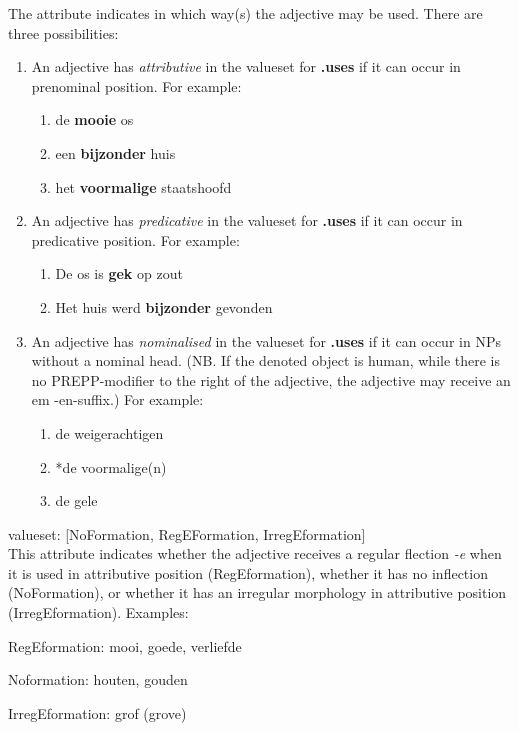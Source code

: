 \begin{description}
The attribute indicates in which way(s) the adjective may be used.
There are three possibilities:\\
\begin{enumerate}
  \item An adjective has {\em attributive} in the valueset for {\bf .uses}
 if it can occur in prenominal position. For example:
\begin{enumerate}
  \item de {\bf mooie} os
  \item een {\bf bijzonder} huis
  \item het  {\bf voormalige} staatshoofd
\end{enumerate}
  \item An adjective has {\em predicative} in the valueset for {\bf .uses}
 if it can occur in predicative position. For example:
\begin{enumerate}
  \item De os is {\bf gek} op zout 
  \item Het huis werd {\bf bijzonder} gevonden
\end{enumerate}
  \item An adjective has {\em nominalised} in the valueset for {\bf .uses}
 if it can occur in NPs without a nominal head. (NB. If the denoted object
is human, while there is no PREPP-modifier to the right of the adjective, the 
adjective may receive an {em -en}-suffix.) For example:
\begin{enumerate}
  \item de weigerachtigen
  \item *de voormalige(n)
  \item de gele 
\end{enumerate}
\end{enumerate}


\newpage
\item [eFormation]\mbox{}


    valueset: [NoFormation, RegEFormation, IrregEformation]\\

This attribute indicates whether the adjective receives a regular 
flection {\em -e}
when it is used in attributive position (RegEformation), whether it has no 
inflection (NoFormation), or whether it has an irregular 
morphology in attributive position (IrregEformation).
Examples:\\
\begin{description}
  \item RegEformation: mooi, goede, verliefde
  \item Noformation: houten, gouden
  \item IrregEformation: grof (grove) 
\end{description}


\end{description}
